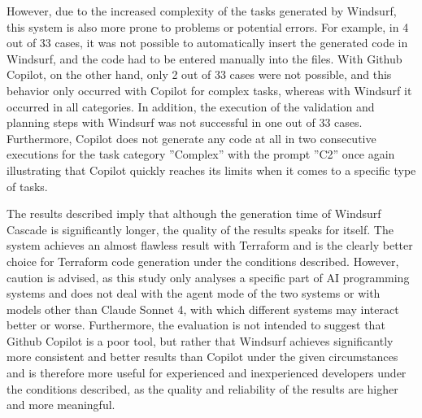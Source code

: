 However, due to the increased complexity of the tasks generated by Windsurf, this system is also more prone to problems or potential errors. For example, in 4 out of 33 cases, it was not possible to automatically insert the generated code in Windsurf, and the code had to be entered manually into the files. With Github Copilot, on the other hand, only 2 out of 33 cases were not possible, and this behavior only occurred with Copilot for complex tasks, whereas with Windsurf it occurred in all categories. In addition, the execution of the validation and planning steps with Windsurf was not successful in one out of 33 cases. Furthermore, Copilot does not generate any code at all in two consecutive executions for the task category ''Complex'' with the prompt ''C2'' once again illustrating that Copilot quickly reaches its limits when it comes to a specific type of tasks. 

The results described imply that although the generation time of Windsurf Cascade is significantly longer, the quality of the results speaks for itself. The system achieves an almost flawless result with Terraform and is the clearly better choice for Terraform code generation under the conditions described. However, caution is advised, as this study only analyses a specific part of AI programming systems and does not deal with the agent mode of the two systems or with models other than Claude Sonnet 4, with which different systems may interact better or worse. Furthermore, the evaluation is not intended to suggest that Github Copilot is a poor tool, but rather that Windsurf achieves significantly more consistent and better results than Copilot under the given circumstances and is therefore more useful for experienced and inexperienced developers under the conditions described, as the quality and reliability of the results are higher and more meaningful.